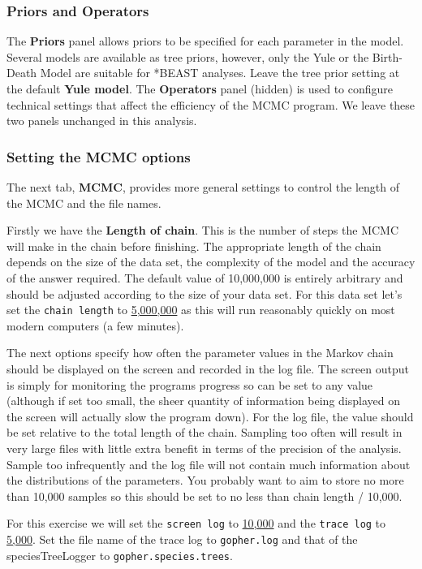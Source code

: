 \documentclass{article}
\newcommand{\chainLength}{{5,000,000}}
\newcommand{\logEvery}{{5,000}}
\newcommand{\screenEvery}{{10,000}}
\begin{document}
\subsubsection*{Priors and Operators}

The {\bf Priors} panel allows priors to be specified for each parameter in the model. 
Several models are available as tree priors, however, only the Yule or the Birth-Death Model are suitable for *BEAST analyses. Leave the tree prior setting at the default \textbf{Yule model}. The {\bf Operators} panel (hidden) is used to configure technical settings that affect the efficiency of the MCMC program. We leave these two panels unchanged in this analysis.

\subsubsection*{Setting the MCMC options }

The next tab, {\bf MCMC}, provides more general
settings to control the length of the MCMC and the file names. 

Firstly we have the \textbf{Length of chain}. This is the number of
steps the MCMC will make in the chain before finishing. The appropriate length of the chain depends on the size of the data set, the complexity of the
model and the accuracy of the answer required. The default value of 10,000,000
is entirely arbitrary and should be adjusted according to the size
of your data set. For this data set let's set the \texttt{chain
length} to \underline{\chainLength{}} as this will run reasonably quickly on most modern
computers (a few minutes).

The next options specify how often the parameter values in the Markov
chain should be displayed on the screen and recorded in the log file.
The screen output is simply for monitoring the programs progress so
can be set to any value (although if set too small, the sheer quantity
of information being displayed on the screen will actually slow the
program down). For the log file, the value should be set relative
to the total length of the chain. Sampling too often will result in
very large files with little extra benefit in terms of the precision
of the analysis. Sample too infrequently and the log file will not
contain much information about the distributions of the parameters. 
You probably want to aim to store no more than 10,000 samples so this should be
set to no less than chain length / 10,000.

For this exercise we will set the \texttt{screen log} to \underline{\screenEvery{}} and the \texttt{trace log} to \underline{\logEvery{}}. 
Set the file name of the trace log to \texttt{gopher.log} and that of the speciesTreeLogger to \texttt{gopher.species.trees}.
\end{document}

